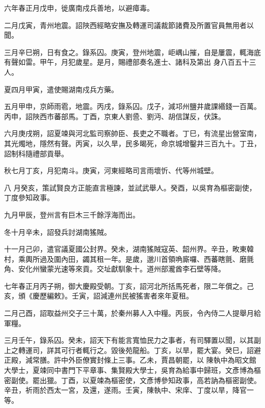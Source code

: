 \begin{pinyinscope}
 六年春正月戊申，徙廣南戍兵善地，以避瘴毒。



 二月戊寅，青州地震。詔陜西經略安撫及轉運司議裁節諸費及所置官員無用者以聞。



 三月辛巳朔，日有食之。錄系囚。庚寅，登州地震，岠嵎山摧，自是屢震，輒海底有聲如雷。甲午，月犯歲星。是月，賜禮部奏名進士、諸科及第出
 身八百五十三人。



 夏四月甲寅，遣使賜湖南戍兵方藥。



 五月甲申，京師雨雹，地震。丙戌，錄系囚。戊子，減邛州鹽井歲課緡錢一百萬。丙申，詔陜西市蕃部馬。丁酉，京東人劉巹、劉沔、胡信謀反，伏誅。



 六月庚戌朔，詔夏竦與河北監司察帥臣、長吏之不職者。丁巳，有流星出營室南，其光燭地，隱然有聲。丙寅，以久旱，民多暍死，命京城增鑿井三百九十。丁丑，詔制科隨禮部貢舉。



 秋七月丁亥，月犯南斗。庚寅，河東經略司言雨壞忻、代等州城壁。



 八
 月癸亥，策試賢良方正能直言極諫，並試武舉人。癸酉，以吳育為樞密副使，丁度參知政事。



 九月甲辰，登州言有巨木三千餘浮海而出。



 冬十月辛未，詔發兵討湖南猺賊。



 十一月己卯，遣官議夏國公封界。癸未，湖南猺賊寇英、韶州界。辛丑，畋東韓村，乘輿所過及圍內田，蠲其租一年。是歲，邈川首領唃廝囉、西蕃瞎氈、磨氈角、安化州蠻蒙光速等來貢。交址獻馴象十。道州部瀧酋李石壁等降。



 七年春正月丙子朔，御大慶殿受朝。丁亥，詔河北所括馬死者，限二年償之。己亥，頒《慶歷編敕》。壬寅，詔減連州民被猺害者來年夏租。



 二月己酉，詔取益州交子三十萬，於秦州募人入中糧。丙辰，令內侍二人提舉月給軍糧。



 三月壬午，錄系囚。癸未，詔天下有能言寬恤民力之事者，有司驛置以聞，以其副上之轉運司，詳其可行者輒行之。毀後苑龍船。丁亥，以旱，罷大宴。癸巳，詔避正殿，減常膳。許中外臣僚實封條上三事。乙未，賈昌朝罷，以
 陳執中為昭文館大學士，夏竦同中書門下平章事、集賢殿大學士，吳育為給事中歸班，文彥博為樞密副使。罷出獵。丁酉，以夏竦為樞密使，文彥博參知政事，高若訥為樞密副使。辛丑，祈雨於西太一宮，及還，遂雨。壬寅，陳執中、宋庠、丁度以旱，降官一等。




\end{pinyinscope}
